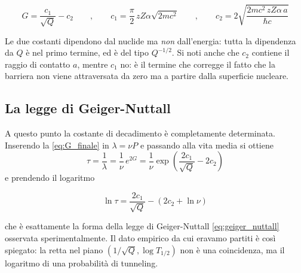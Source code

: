 \begin{tcolorbox}[colback=black!5!white, colframe=black!45!white, boxrule=0.8pt]
\begin{equation}
    G = \frac{c_1}{\sqrt{Q}} - c_2 \qquad , \qquad c_1 = \frac{\pi}{2}\, zZ\alpha \sqrt{2mc^2} \qquad , \qquad c_2 = 2\sqrt{\frac{2mc^2 \, zZ\alpha \, a}{\hbar c}}
    \label{eq:G_finale}
\end{equation}
\end{tcolorbox}
Le due costanti dipendono dal nuclide ma \emph{non} dall'energia: tutta la dipendenza da $Q$ è nel primo termine, ed è del tipo $Q^{-1/2}$. Si noti anche che $c_2$ contiene il raggio di contatto $a$, mentre $c_1$ no: è il termine che corregge il fatto che la barriera non viene attraversata da zero ma a partire dalla superficie nucleare.\\

\subsection*{La legge di Geiger-Nuttall}

A questo punto la costante di decadimento è completamente determinata. Inserendo la \eqref{eq:G_finale} in $\lambda = \nu P$ e passando alla vita media si ottiene
%
\begin{equation}
    \tau = \frac{1}{\lambda} = \frac{1}{\nu}\, e^{2G} = \frac{1}{\nu}\exp\left(\frac{2c_1}{\sqrt{Q}} - 2c_2\right)
    \label{eq:tau_gamow}
\end{equation}
e prendendo il logaritmo

\begin{tcolorbox}[colback=black!5!white, colframe=black!45!white, boxrule=0.8pt]
\begin{equation}
    \ln \tau = \frac{2c_1}{\sqrt{Q}} - \left(2c_2 + \ln \nu\right)
    \label{eq:GN_derivata}
\end{equation}
\end{tcolorbox}
che è esattamente la forma della legge di Geiger-Nuttall \eqref{eq:geiger_nuttall} osservata sperimentalmente. Il dato empirico da cui eravamo partiti è così spiegato: la retta nel piano $(1/\sqrt{Q}, \log T_{1/2})$ non è una coincidenza, ma il logaritmo di una probabilità di tunneling.\\